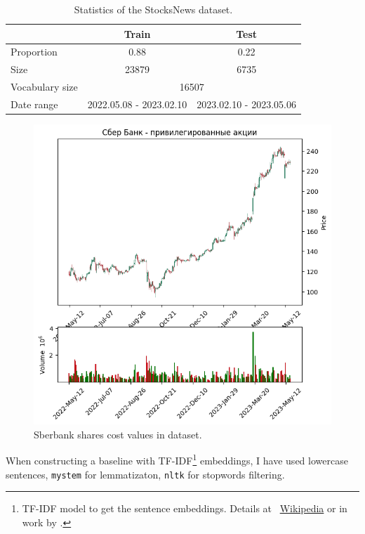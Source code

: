 \documentclass{article}
\begin{document}
\begin{table}[tbh!]
\begin{center}
\begin{tabular}[t]{|l|cc|}
\hline
 & Train & Test \\
\hline
Proportion & 0.88 & 0.22  \\
Size & 23879 & 6735 \\
Vocabulary size & \multicolumn{2}{c|}{16507} \\
Date range & 2022.05.08 - 2023.02.10 & 2023.02.10 - 2023.05.06 \\

\hline
\end{tabular}
\caption{Statistics of the StocksNews dataset.}
\label{tab:statistics}
\end{center}
\end{table}

\begin{figure}[!tbh]
    \centering
    \includegraphics[width=0.9\linewidth]{sber.png}
    \caption{Sberbank shares cost values in dataset.}
    \label{fig:sber}
\end{figure}

When constructing a baseline with TF-IDF\footnote{TF-IDF model to get the sentence embeddings. Details at ~\href{https://ru.wikipedia.org/wiki/TF-IDF}{Wikipedia} or in work by \cite{Ramos1999}.} embeddings, I have used lowercase sentences, \texttt{mystem} for lemmatizaton, \texttt{nltk} for stopwords filtering.
\end{document}
